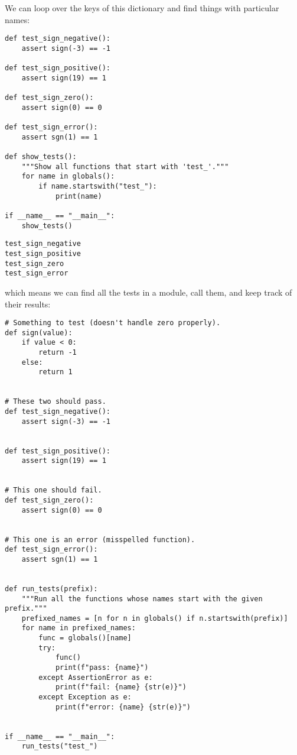 \documentclass{scrbook}
\begin{document}
We can loop over the keys of this dictionary and find things with particular names:


\begin{lstlisting}[frame=single,frameround=tttt]
def test_sign_negative():
    assert sign(-3) == -1

def test_sign_positive():
    assert sign(19) == 1

def test_sign_zero():
    assert sign(0) == 0

def test_sign_error():
    assert sgn(1) == 1

def show_tests():
    """Show all functions that start with 'test_'."""
    for name in globals():
        if name.startswith("test_"):
            print(name)

if __name__ == "__main__":
    show_tests()
\end{lstlisting}



\begin{lstlisting}[frame=single,frameround=tttt]
test_sign_negative
test_sign_positive
test_sign_zero
test_sign_error
\end{lstlisting}



\noindent which means we can find all the tests in a module,
call them,
and keep track of their results:


\begin{lstlisting}[frame=single,frameround=tttt]
# Something to test (doesn't handle zero properly).
def sign(value):
    if value < 0:
        return -1
    else:
        return 1


# These two should pass.
def test_sign_negative():
    assert sign(-3) == -1


def test_sign_positive():
    assert sign(19) == 1


# This one should fail.
def test_sign_zero():
    assert sign(0) == 0


# This one is an error (misspelled function).
def test_sign_error():
    assert sgn(1) == 1


def run_tests(prefix):
    """Run all the functions whose names start with the given prefix."""
    prefixed_names = [n for n in globals() if n.startswith(prefix)]
    for name in prefixed_names:
        func = globals()[name]
        try:
            func()
            print(f"pass: {name}")
        except AssertionError as e:
            print(f"fail: {name} {str(e)}")
        except Exception as e:
            print(f"error: {name} {str(e)}")


if __name__ == "__main__":
    run_tests("test_")
\end{lstlisting}
\end{document}
